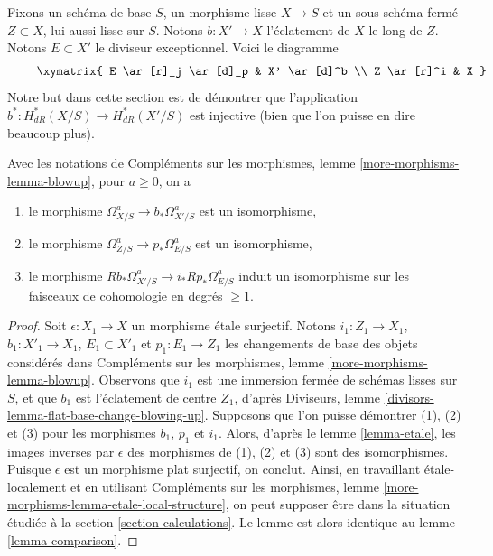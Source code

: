 \noindent
Fixons un schéma de base $S$, un morphisme lisse $X \to S$ et un sous-schéma fermé
$Z \subset X$, lui aussi lisse sur $S$. Notons $b : X' \to X$
l'éclatement de $X$ le long de $Z$. Notons $E \subset X'$ le diviseur
exceptionnel. Voici le diagramme
\begin{equation}
\label{equation-blowup}
\vcenter{
\xymatrix{
E \ar[r]_j \ar[d]_p & X' \ar[d]^b \\
Z \ar[r]^i & X
}
}
\end{equation}
Notre but dans cette section est de démontrer que l'application
$b^* : H_{dR}^*(X/S) \longrightarrow H_{dR}^*(X'/S)$
est injective (bien que l'on puisse en dire beaucoup plus).

\begin{lemma}
\label{lemma-comparison-general}
Avec les notations de Compléments sur les morphismes, lemme \ref{more-morphisms-lemma-blowup},
pour $a \geq 0$, on a
\begin{enumerate}
\item le morphisme
$\Omega^a_{X/S} \to b_*\Omega^a_{X'/S}$ est un isomorphisme,
\item le morphisme $\Omega^a_{Z/S} \to p_*\Omega^a_{E/S}$ est un isomorphisme,
\item le morphisme $Rb_*\Omega^a_{X'/S} \to i_*Rp_*\Omega^a_{E/S}$ induit un isomorphisme
sur les faisceaux de cohomologie en degrés $\geq 1$.
\end{enumerate}
\end{lemma}

\begin{proof}
Soit $\epsilon : X_1 \to X$ un morphisme étale surjectif. Notons
$i_1 : Z_1 \to X_1$, $b_1 : X'_1 \to X_1$, $E_1 \subset X'_1$ et
$p_1 : E_1 \to Z_1$ les changements de base des objets considérés dans
Compléments sur les morphismes, lemme \ref{more-morphisms-lemma-blowup}.
Observons que $i_1$ est une immersion fermée
de schémas lisses sur $S$, et que $b_1$ est l'éclatement de centre
$Z_1$, d'après Diviseurs, lemme \ref{divisors-lemma-flat-base-change-blowing-up}.
Supposons que l'on puisse démontrer (1), (2) et (3)
pour les morphismes $b_1$, $p_1$ et $i_1$. Alors, d'après
le lemme \ref{lemma-etale}, les images inverses par $\epsilon$
des morphismes de (1), (2) et (3) sont des isomorphismes. Puisque $\epsilon$
est un morphisme plat surjectif, on conclut.
Ainsi, en travaillant étale-localement et en utilisant
Compléments sur les morphismes, lemme \ref{more-morphisms-lemma-etale-local-structure},
on peut supposer être dans la situation étudiée à la
section \ref{section-calculations}. Le lemme est alors
identique au lemme \ref{lemma-comparison}.
\end{proof}


